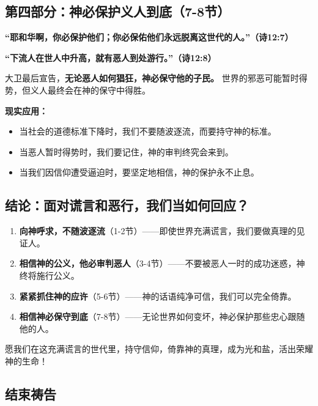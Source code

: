 \documentclass[a4paper, 12pt]{article}
\begin{document}
\subsection*{第四部分：神必保护义人到底（7-8节）}
\hspace{0.4cm}\textbf{“耶和华啊，你必保护他们；你必保佑他们永远脱离这世代的人。”（诗12:7）  }

\textbf{“下流人在世人中升高，就有恶人到处游行。”（诗12:8）  }

\vspace{0.2cm}

大卫最后宣告，\textbf{无论恶人如何猖狂，神必保守他的子民。} 世界的邪恶可能暂时得势，但义人最终会在神的保守中得胜。  

\vspace{0.2cm}

\textbf{现实应用：}

\begin{itemize}
    \item 当社会的道德标准下降时，我们不要随波逐流，而要持守神的标准。
    \item 当恶人暂时得势时，我们要记住，神的审判终究会来到。
    \item 当我们因信仰遭受逼迫时，要坚定地相信，神的保护永不止息。
\end{itemize}


\subsection*{结论：面对谎言和恶行，我们当如何回应？}

\begin{enumerate}
    \item \textbf{向神呼求，不随波逐流}（1-2节）——即使世界充满谎言，我们要做真理的见证人。  
    \item \textbf{相信神的公义，他必审判恶人}（3-4节）——不要被恶人一时的成功迷惑，神终将施行公义。
    \item \textbf{紧紧抓住神的应许}（5-6节）——神的话语纯净可信，我们可以完全倚靠。  
    \item \textbf{相信神必保守到底}（7-8节）——无论世界如何变坏，神必保护那些忠心跟随他的人。  
\end{enumerate}

愿我们在这充满谎言的世代里，持守信仰，倚靠神的真理，成为光和盐，活出荣耀神的生命！  



\subsection*{结束祷告}
\end{document}
